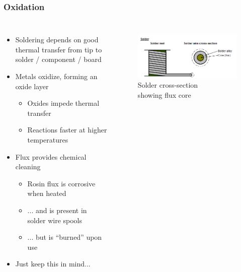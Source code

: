 \documentclass{beamer}
\begin{document}
\begin{frame}
\frametitle{Oxidation}
\begin{columns}[t]
\begin{itemize}
  \item Soldering depends on good thermal transfer from tip to solder / component / board
  \item Metals oxidize, forming an oxide layer
  \begin{itemize}
    \item Oxides impede thermal transfer
    \item Reactions faster at higher temperatures
  \end{itemize}
  \item Flux provides chemical cleaning
  \begin{itemize}
    \item Rosin flux is corrosive when heated
    \item ... and is present in solder wire spools
    \item ... but is ``burned'' upon use
  \end{itemize}
  \item Just keep this in mind...
\end{itemize}

\begin{figure}
\centering
\includegraphics[width=1.0\columnwidth]{images-dis1/solder-reel}
\newline
Solder cross-section \\
showing flux core
\end{figure}
\end{columns}
\end{frame}
\end{document}
